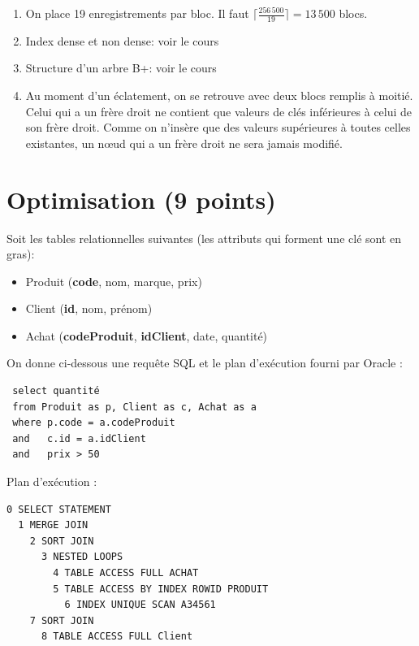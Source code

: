 \begin{solution}
\begin{enumerate}
  \item On place 19 enregistrements par bloc.  Il faut 
        $\lceil \frac{256\,500}{19} \rceil = 13\,500$ blocs.

  \item Index dense et non dense: voir le cours
 
  \item Structure d'un arbre B+: voir le cours

   \item Au moment d'un éclatement, on se retrouve avec deux blocs
     remplis à moitié. Celui qui a un frère droit ne contient que
     valeurs de clés inférieures à celui de son frère droit.
     Comme on n'insère que des valeurs supérieures à toutes celles
     existantes, un n{\oe}ud qui a un frère droit ne sera jamais modifié.
\end{enumerate}
\end{solution}


\section{Optimisation (9 points)}

Soit les tables relationnelles suivantes (les attributs qui forment 
une clé sont en gras):

\begin{itemize}
  \item Produit  (\textbf{code}, nom, marque, prix)
  \item Client  (\textbf{id}, nom, prénom)
  \item Achat    (\textbf{codeProduit}, \textbf{idClient}, date, quantité)
\end{itemize}


On donne ci-dessous une requête SQL et le plan d'exécution fourni par Oracle :

\begin{verbatim}
 select quantité
 from Produit as p, Client as c, Achat as a
 where p.code = a.codeProduit
 and   c.id = a.idClient
 and   prix > 50
\end{verbatim}

Plan d'exécution :


\begin{verbatim}
0 SELECT STATEMENT
  1 MERGE JOIN
    2 SORT JOIN
      3 NESTED LOOPS
        4 TABLE ACCESS FULL ACHAT
        5 TABLE ACCESS BY INDEX ROWID PRODUIT
          6 INDEX UNIQUE SCAN A34561
    7 SORT JOIN
      8 TABLE ACCESS FULL Client
\end{verbatim}

